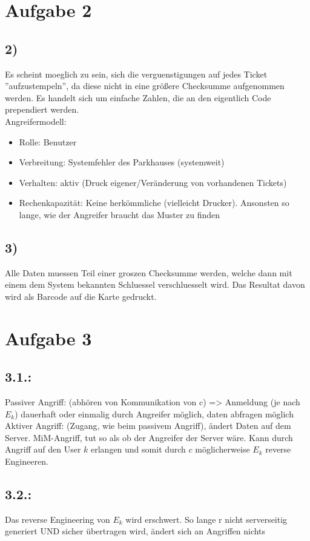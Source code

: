 \documentclass[a4paper,11pt,parskip=half]{scrartcl}
\begin{document}
\section*{Aufgabe 2}
\subsection*{2)}
Es scheint moeglich zu sein, sich die verguenstigungen auf
jedes Ticket ''aufzustempeln'', da diese nicht in eine größere
Checksumme aufgenommen werden. Es handelt sich um einfache
Zahlen, die an den eigentlich Code prependiert werden. \\
Angreifermodell:
\begin{itemize}
	\item Rolle: Benutzer
    \item Verbreitung: Systemfehler des Parkhauses (systemweit)
    \item Verhalten: aktiv (Druck eigener/Veränderung von vorhandenen Tickets)
    \item Rechenkapazität: Keine herkömmliche (vielleicht Drucker). Ansonsten so lange, wie der Angreifer braucht das Muster zu finden
\end{itemize}

\subsection*{3)}
Alle Daten muessen Teil einer groszen Checksumme
werden, welche dann mit einem dem System bekannten Schluessel
verschluesselt wird. Das Resultat davon wird als Barcode auf
die Karte gedruckt.

\section*{Aufgabe 3}
\subsection*{3.1.:}
Passiver Angriff: (abhören von Kommunikation von c) => Anmeldung (je nach \(E_k\)) dauerhaft oder einmalig durch Angreifer möglich, daten abfragen möglich
Aktiver Angriff: (Zugang, wie beim passivem Angriff), ändert Daten auf dem Server. 
	MiM-Angriff, tut so als ob der Angreifer der Server wäre. Kann durch Angriff auf den User \(k\) erlangen und somit durch \(c\) möglicherweise \(E_k\) reverse Engineeren.

\subsection{3.2.:}
Das reverse Engineering von \(E_k\) wird erschwert.
So lange r nicht serverseitig generiert UND sicher übertragen wird, ändert sich an Angriffen nichts
\end{document}
